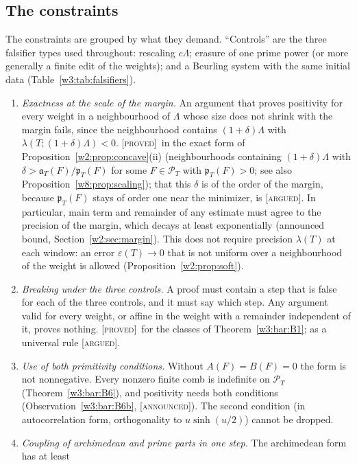 \documentclass[11pt]{amsart}
\theoremstyle{definition}
\theoremstyle{remark}
\numberwithin{equation}{section}
\newcommand{\PT}{\mathcal{P}_T}                        %
\newcommand{\pT}{\mathfrak{p}_T}                       %
\newcommand{\aT}{\mathfrak{a}_T}                       %
\newcommand{\lam}{\lambda(T)}                          %
\newcommand{\stag}[1]{\textsc{[#1]}}
\newcommand{\PROVED}{\stag{proved}}
\newcommand{\ARGUED}{\stag{argued}}
\newcommand{\ANNOUNCED}{\stag{announced}}
\begin{document}
\subsection{The constraints}

The constraints are grouped by what they demand. ``Controls'' are the three falsifier types used throughout:
rescaling $c\Lambda$; erasure of one prime power (or more generally a finite edit of the weights); and a Beurling
system with the same initial data (Table~\ref{w3:tab:falsifiers}).

\begin{enumerate}[label=\textbf{C\arabic*.},ref=C\arabic*,leftmargin=*]
\item\label{w8:con:exact} \emph{Exactness at the scale of the margin.} An argument that proves positivity for every
weight in a neighbourhood of $\Lambda$ whose size does not shrink with the margin fails, since the neighbourhood
contains $(1+\delta)\Lambda$ with $\lambda(T;(1+\delta)\Lambda)<0$. \PROVED\ in the exact form of Proposition~\ref{w2:prop:concave}(ii) (neighbourhoods containing $(1+\delta)\Lambda$ with $\delta>\aT(F)/\pT(F)$ for some $F\in\PT$ with $\pT(F)>0$; see also Proposition~\ref{w8:prop:scaling}); that this $\delta$ is of the order of the margin, because $\pT(F)$ stays of order one near the minimizer, is \ARGUED. In particular, main term and remainder of
any estimate must agree to the precision of the margin, which decays at least exponentially (announced bound,
Section~\ref{w2:sec:margin}). This does not require precision $\lam$ at each window: an error $\varepsilon(T)\to0$
that is not uniform over a neighbourhood of the weight is allowed (Proposition~\ref{w2:prop:soft}).
\item\label{w8:con:controls} \emph{Breaking under the three controls.} A proof must contain a step that is false for
each of the three controls, and it must say which step. Any argument valid for every weight, or affine in the weight
with a remainder independent of it, proves nothing. \PROVED\ for the classes of Theorem~\ref{w3:bar:B1}; as a
universal rule \ARGUED.
\item\label{w8:con:moments} \emph{Use of both primitivity conditions.} Without $A(F)=B(F)=0$ the form is not
nonnegative. Every nonzero finite comb is indefinite on $\PT$ (Theorem~\ref{w3:bar:B6}), and positivity needs both
conditions (Observation~\ref{w3:bar:B6b}, \ANNOUNCED). The second condition (in autocorrelation form, orthogonality to
$u\sinh(u/2)$) cannot be dropped.
\item\label{w8:con:couple} \emph{Coupling of archimedean and prime parts in one step.} The archimedean form has at least

\end{enumerate}
\end{document}
